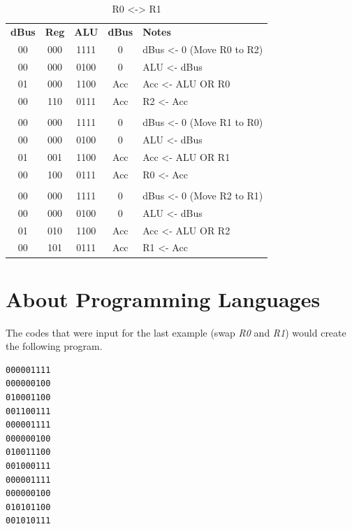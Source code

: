 \begin{table}[H]
	\sffamily
	\newcommand{\head}[1]{\textcolor{white}{\textbf{#1}}}		
	\begin{center}
		\begin{tabular}{ccccl} 
			\textbf{dBus} & \textbf{Reg} & \textbf{ALU} & \textbf{dBus} & \textbf{Notes} \\
			00 & 000 & 1111 & 0 & dBus <- 0 (Move R0 to R2)\\
			00 & 000 & 0100 & 0 & ALU <- dBus \\
			01 & 000 & 1100 & Acc & Acc <- ALU OR R0 \\
			00 & 110 & 0111 & Acc & R2 <- Acc \\
 			& & & & \\ %

			00 & 000 & 1111 & 0 & dBus <- 0 (Move R1 to R0)\\
			00 & 000 & 0100 & 0 & ALU <- dBus \\
			01 & 001 & 1100 & Acc & Acc <- ALU OR R1 \\
			00 & 100 & 0111 & Acc & R0 <- Acc \\
 			& & & & \\ %

			00 & 000 & 1111 & 0 & dBus <- 0 (Move R2 to R1)\\
			00 & 000 & 0100 & 0 & ALU <- dBus \\
			01 & 010 & 1100 & Acc & Acc <- ALU OR R2 \\
			00 & 101 & 0111 & Acc & R1 <- Acc
		\end{tabular}
	\end{center}
	\caption{R0 <-> R1}
	\label{tab:11-08}
\end{table}

\section{About Programming Languages}

The codes that were input for the last example (swap \textit{R0} and \textit{R1}) would create the following program.

\begin{Verbatim}[frame=lines,
xleftmargin=10mm,
xrightmargin=10mm]
000001111
000000100
010001100
001100111
000001111
000000100
010011100
001000111
000001111
000000100
010101100
001010111
\end{Verbatim}

